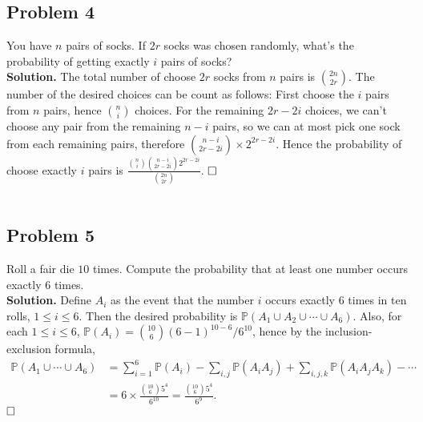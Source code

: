 \documentclass[12pt]{article}
\begin{document}
\subsection*{Problem 4} You have $n$ pairs of socks. If $2r$ socks was chosen randomly, what’s the probability of getting exactly $i$ pairs of socks?
\\
\textbf{Solution.} The total number of choose $2r$ socks from $n$ pairs is $\binom{2n}{2r}$. The number of the desired choices can be count as follows: First choose the $i$ pairs from $n$ pairs, hence $\binom{n}{i}$ choices. For the remaining $2r-2i$ choices, we can't choose any pair from the remaining $n-i$ pairs, so we can at most pick one sock from each remaining pairs, therefore $\binom{n-i}{2r-2i}\times 2^{2r-2i}$. Hence the probability of choose exactly $i$ pairs is $\frac{\binom{n}{i}\binom{n-i}{2r-2i} 2^{2r-2i}}{\binom{2n}{2r}}$.
$\hspace{\fill}\square$
\\ \\
\subsection*{Problem 5}
Roll a fair die $10$ times. Compute the probability that at least one number occurs
exactly $6$ times.
\\
\textbf{Solution.} Define $A_i$ as the event that the number $i$ occurs exactly $6$ times in ten rolls, $1\leq i\leq 6$. Then the desired probability is $\mathbb{P}(A_1\cup A_2\cup\cdots\cup A_6)$. Also, for each $1\leq i\leq 6$, $\mathbb{P}(A_i)=\binom{10}{6}(6-1)^{10-6}/6^{10}$, hence by the inclusion-exclusion formula,
\begin{equation*}
\begin{aligned}
\mathbb{P}(A_1\cup\cdots\cup A_6)&=\sum_{i=1}^6\mathbb{P}(A_i)-\sum_{i,j}\mathbb{P}(A_iA_j)+\sum_{i,j,k}\mathbb{P}(A_iA_jA_k)-\cdots \\&
=6\times\frac{\binom{10}{6}5^4}{6^{10}}=\frac{\binom{10}{6}5^4}{6^{9}}.
\end{aligned}
\end{equation*}
$\hspace{\fill}\square$
\end{document}
